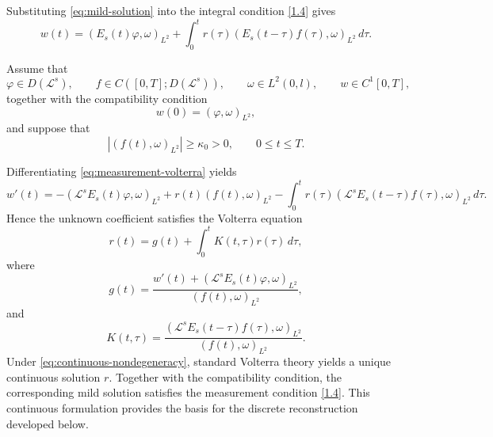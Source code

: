 \documentclass[reqno]{amsart}
\begin{document}
Substituting \eqref{eq:mild-solution} into the integral condition
\eqref{1.4} gives
\begin{equation}\label{eq:measurement-volterra}
w(t)
=
(E_s(t)\varphi,\omega)_{L^2}
+
\int_0^t
r(\tau)
(E_s(t-\tau)f(\tau),\omega)_{L^2}
\,d\tau .
\end{equation}

Assume that
\[
\varphi\in D(\mathcal L^s),
\qquad
f\in C([0,T];D(\mathcal L^s)),
\qquad
\omega\in L^2(0,l),
\qquad
w\in C^1[0,T],
\]
together with the compatibility condition
\begin{equation}\label{eq:compatibility}
w(0)=(\varphi,\omega)_{L^2},
\end{equation}
and suppose that
\begin{equation}\label{eq:continuous-nondegeneracy}
|(f(t),\omega)_{L^2}|
\ge\kappa_0>0,
\qquad 0\le t\le T.
\end{equation}


Differentiating \eqref{eq:measurement-volterra} yields
\[
w'(t)
=
-(\mathcal L^sE_s(t)\varphi,\omega)_{L^2}
+
r(t)(f(t),\omega)_{L^2}
-
\int_0^t
r(\tau)
(\mathcal L^sE_s(t-\tau)f(\tau),\omega)_{L^2}
\,d\tau .
\]
Hence the unknown coefficient satisfies the Volterra equation
\begin{equation}\label{eq:continuous-volterra-r}
r(t)
=
g(t)
+
\int_0^t K(t,\tau)r(\tau)\,d\tau ,
\end{equation}
where
\[
g(t)
=
\frac{
w'(t)
+
(\mathcal L^sE_s(t)\varphi,\omega)_{L^2}
}{
(f(t),\omega)_{L^2}
},
\]
and
\[
K(t,\tau)
=
\frac{
(\mathcal L^sE_s(t-\tau)f(\tau),\omega)_{L^2}
}{
(f(t),\omega)_{L^2}
}.
\]
Under \eqref{eq:continuous-nondegeneracy}, standard Volterra theory yields
a unique continuous solution $r$. Together with the compatibility condition,
the corresponding mild solution satisfies the measurement condition
\eqref{1.4}. This continuous formulation provides the basis for the discrete
reconstruction developed below.
\end{document}
